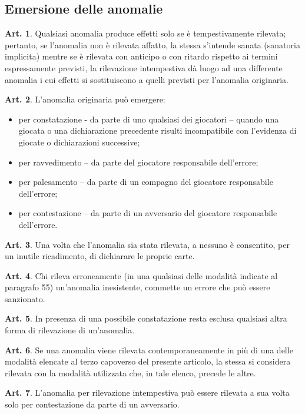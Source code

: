 \documentclass[italian,a4paper]{article}
\theoremstyle{definition}
\newtheorem{art}{Art.}
\newenvironment{packeditem}{
\begin{itemize}
  \setlength{\itemsep}{1pt}
  \setlength{\parskip}{0pt}
  \setlength{\parsep}{0pt}
}{\end{itemize}}
\begin{document}
\subsection{Emersione delle anomalie}
\begin{art}
    Qualsiasi anomalia produce effetti solo se è tempestivamente rilevata; pertanto, se l'anomalia non è rilevata affatto, la stessa s'intende sanata (sanatoria implicita) mentre se è rilevata con anticipo o con ritardo rispetto ai termini espressamente previsti, la rilevazione intempestiva dà luogo ad una differente anomalia i cui effetti si sostituiscono a quelli previsti per l'anomalia originaria.
\end{art}
\begin{art}
    L'anomalia originaria può emergere:
    \begin{packeditem}
\item  per constatazione - da parte di uno qualsiasi dei giocatori – quando una giocata o una dichiarazione precedente risulti incompatibile con l'evidenza di giocate o dichiarazioni successive;
\item  per ravvedimento – da parte del giocatore responsabile dell'errore;
\item  per palesamento – da parte di un compagno del giocatore responsabile dell'errore;
\item  per contestazione – da parte di un avversario del giocatore responsabile dell'errore.
    \end{packeditem}
\end{art}
\begin{art}
    Una volta che l'anomalia sia stata rilevata, a nessuno è consentito, per un inutile ricadimento, di dichiarare le proprie carte.
\end{art}
\begin{art}
    Chi rileva erroneamente (in una qualsiasi delle modalità indicate al paragrafo 55) un'anomalia inesistente, commette un errore che può essere sanzionato.
\end{art}
\begin{art}
    In presenza di una possibile constatazione resta esclusa qualsiasi altra forma di rilevazione di un'anomalia.
\end{art}
\begin{art}
    Se una anomalia viene rilevata contemporaneamente in più di una delle modalità elencate al terzo capoverso del presente articolo, la stessa si considera rilevata con la modalità utilizzata che, in tale elenco, precede le altre.
\end{art}
\begin{art}
    L'anomalia per rilevazione intempestiva può essere rilevata a sua volta solo per contestazione da parte di un avversario.
\end{art}
\end{document}

